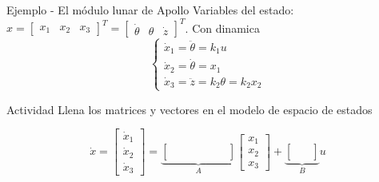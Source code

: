 \documentclass[presentation,aspectratio=1610]{beamer}
\begin{document}
\begin{frame}[label={sec:orgbf963a5}]{Ejemplo - El módulo lunar de Apollo}
Variables del estado: \(x = \begin{bmatrix} x_1 & x_2 & x_3 \end{bmatrix}^T = \begin{bmatrix} \dot{\theta} & \theta & \dot{z} \end{bmatrix}^T\). Con dinamica
\[ \begin{cases} \dot{x}_1 =  \ddot{\theta} = k_1 u\\ \dot{x}_2 = \dot{\theta} = x_1\\ \dot{x}_3 = \ddot{z} = k_2\theta = k_2x_2 \end{cases} \]

\alert{Actividad} Llena los matrices y vectores en el modelo de espacio de estados

\[ \dot{x} = \begin{bmatrix} \dot{x}_1\\\dot{x}_2\\\dot{x}_3\end{bmatrix} = \underbrace{\begin{bmatrix} \quad & \quad &\quad \\\quad & \quad& \quad\\ \quad& \quad &\quad \end{bmatrix}}_{A} \begin{bmatrix} x_1\\x_2\\x_3\end{bmatrix} + \underbrace{\begin{bmatrix} \quad \\ \quad \\\quad  \end{bmatrix}}_{B} u \]
\end{frame}
\end{document}
